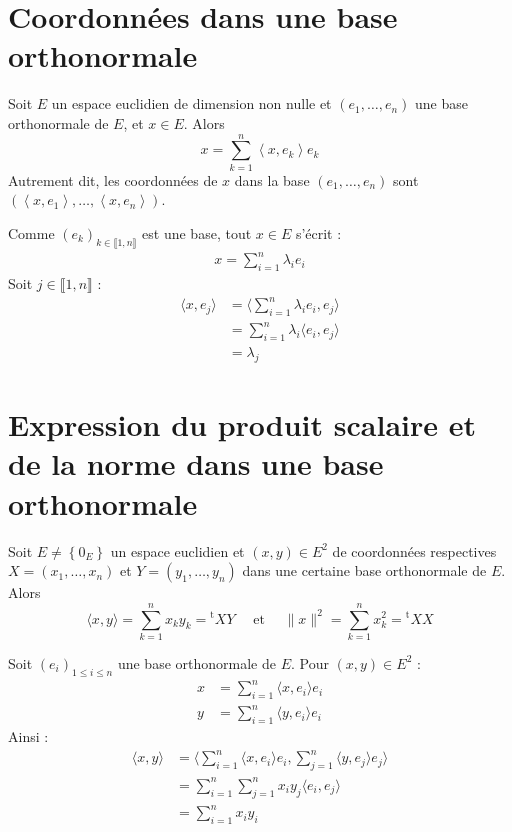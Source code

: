 \documentclass[../main.tex]{subfiles}
\begin{document}
\section{Coordonnées dans une base orthonormale}
\begin{tcolorbox}[title=Théorème 34.26, title filled=false, colframe=orange, colback=orange!10!white]
    Soit $E$ un espace euclidien de dimension non nulle et $\left(e_1, \ldots, e_n\right)$ une base orthonormale de $E$, et $x \in E$. Alors
    $$x=\sum_{k=1}^n\left\langle x, e_k\right\rangle e_k$$
    Autrement dit, les coordonnées de $x$ dans la base $\left(e_1, \ldots, e_n\right)$ sont $\left(\left\langle x, e_1\right\rangle, \ldots,\left\langle x, e_n\right\rangle\right)$.
\end{tcolorbox}

\noindent Comme $(e_k)_{k\in \llbracket 1, n \rrbracket}$ est une base, tout $x\in E$ s'écrit : 
\begin{align*}
    x = \sum_{i=1}^{n} \lambda_i e_i
\end{align*}
Soit $j\in \llbracket 1, n \rrbracket$ : 
\begin{align*}
    \langle x, e_j \rangle &= \langle \sum_{i=1}^{n} \lambda_i e_i, e_j \rangle \\
    &= \sum_{i=1}^{n} \lambda_i \langle e_i, e_j \rangle \\
    &= \lambda_j 
\end{align*}

\section{Expression du produit scalaire et de la norme dans une base orthonormale}
\begin{tcolorbox}[title=Théorème 34.27, title filled=false, colframe=orange, colback=orange!10!white]
    Soit $E \neq\left\{0_E\right\}$ un espace euclidien et $(x, y) \in E^2$ de coordonnées respectives $X=\left(x_1, \ldots, x_n\right)$ et $Y=\left(y_1, \ldots, y_n\right)$ dans une certaine base orthonormale de $E$. Alors
    $$\langle x, y\rangle=\sum_{k=1}^n x_k y_k={ }^{\mathrm{t}} X Y \quad \text { et } \quad\|x\|^2=\sum_{k=1}^n x_k^2={ }^{\mathrm{t}} X X$$
\end{tcolorbox}

\noindent Soit $(e_i)_{1\leq i\leq n}$ une base orthonormale de $E$. Pour $(x, y)\in E^2$ : 
\begin{align*}
    x &= \sum_{i=1}^{n} \langle x, e_i\rangle e_i \\
    y &= \sum_{i=1}^{n} \langle y, e_i\rangle e_i
\end{align*}
Ainsi :
\begin{align*}
    \langle x, y\rangle &= \langle \sum_{i=1}^{n} \langle x, e_i\rangle e_i, \sum_{j=1}^{n} \langle y, e_j\rangle e_j \rangle \\
    &= \sum_{i=1}^{n} \sum_{j=1}^{n} x_i y_j \langle e_i, e_j\rangle \\
    &= \sum_{i=1}^{n} x_i y_i
\end{align*}
\end{document}
